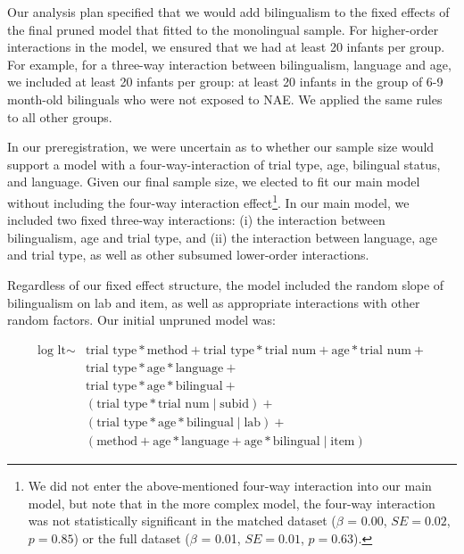 \documentclass[,man,floatsintext]{apa6}
\begin{document}
Our analysis plan specified that we would add bilingualism to the fixed effects of the final pruned model that fitted to the monolingual sample. For higher-order interactions in the model, we ensured that we had at least 20 infants per group. For example, for a three-way interaction between bilingualism, language and age, we included at least 20 infants per group: at least 20 infants in the group of 6-9 month-old bilinguals who were not exposed to NAE. We applied the same rules to all other groups.

In our preregistration, we were uncertain as to whether our sample size would support a model with a four-way-interaction of trial type, age, bilingual status, and language. Given our final sample size, we elected to fit our main model without including the four-way interaction effect\footnote{We did not enter the above-mentioned four-way interaction into our main model, but note that in the more complex model, the four-way interaction was not statistically significant in the matched dataset ($\beta$ = 0.00, $SE = 0.02$, $p = 0.85$) or the full dataset ($\beta$ = 0.01, $SE = 0.01$, $p = 0.63$).}. In our main model, we included two fixed three-way interactions: (i) the interaction between bilingualism, age and trial type, and (ii) the interaction between language, age and trial type, as well as other subsumed lower-order interactions.

Regardless of our fixed effect structure, the model included the random slope of bilingualism on lab and item, as well as appropriate interactions with other random factors. Our initial unpruned model was:

\begin{equation}
\begin{split}
\text{log lt} \sim & \text{trial type} * \text{method} + \text{trial type} * \text{trial num} + \text{age} * \text{trial num} + \\
& \text{trial type} * \text{age} * \text{language} + \\
& \text{trial type} * \text{age} * \text{bilingual} + \\
& (\text{trial type} * \text{trial num} \mid \text{subid}) + \\
& (\text{trial type} * \text{age} * \text{bilingual} \mid \text{lab}) + \\
& (\text{method} + \text{age} * \text{language} + \text{age} * \text{bilingual} \mid \text{item})
\end{split}
\end{equation}
\end{document}
